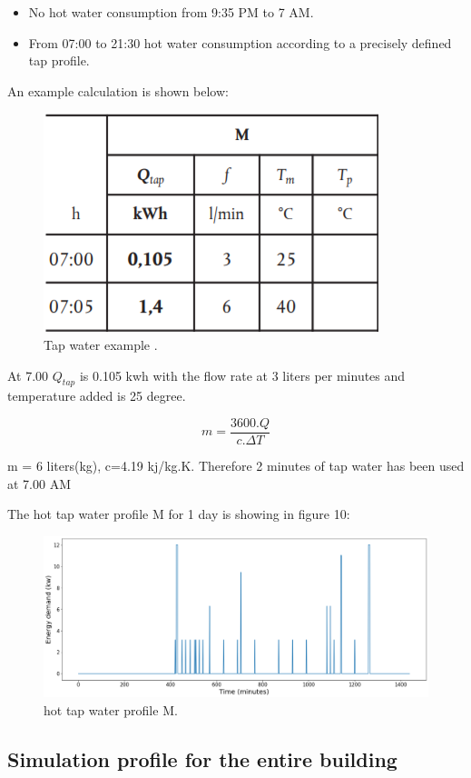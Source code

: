 \begin{itemize}
      \item No hot water consumption from 9:35 PM to 7 AM.
      \item From 07:00 to 21:30 hot water consumption according to a precisely defined tap profile.
    \end{itemize}
An example calculation is shown below: 

\begin{figure}[H]
\centering
\includegraphics[width=0.6\columnwidth]{pictures/Tap_water example.png}
\caption[Short title]{Tap water example \cite{VERORDENING}.}
\label{fig:twexample}
\end{figure}
At 7.00 $Q_{tap}$ is 0.105 kwh with the flow rate at 3 liters  per minutes and temperature added is 25 degree.

\[m = \frac{3600.Q}{c.\Delta T}\]

m = 6 liters(kg), c=4.19 kj/kg.K. Therefore 2 minutes of tap water has been used at 7.00 AM

The hot tap water profile M for 1 day is showing in figure 10:

\begin{figure}[H]
\centering
\includegraphics[width=1\columnwidth]{pictures/hot_tap_water_profile_M.png}
\caption[Short title]{hot tap water profile M.}
\label{fig:htwM}
\end{figure}

\subsection{Simulation profile for the entire building}

